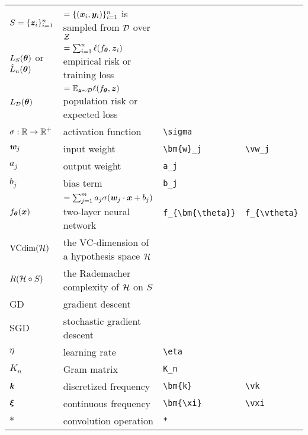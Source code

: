 \documentclass[]{report}
\begin{document}
\begin{center}
\begin{tabular}{l|l|l|l}
        $S=\{\bm{z}_i\}_{i=1}^n$
        & $=\{(\bm{x}_i,\bm{y}_i)\}_{i=1}^n$ is sampled from  $\mathcal{D}$ over  $\mathcal{Z}$\\
        $L_S(\bm{\theta})$ or $\hat{L}_{n}(\bm{\theta})$ & $=\sum_{i=1}^n\ell(f_{\bm{\theta}},\bm{z}_i)$ empirical risk or training loss\\
        $L_{\mathcal{D}}(\bm{\theta})$ &$=\mathbb{E}_{\bm{z}\sim\mathcal{D}}\ell(f_{\bm{\theta}},\bm{z})$ population risk or expected loss\\
        $\sigma:\mathbb{R}\to\mathbb{R}^+$& activation function &\verb!\sigma!\\
        $\bm{w}_j$ &input weight&\verb!\bm{w}_j!&\verb!\vw_j!\\
        $a_j$ &output weight &\verb!a_j!\\
        $b_j$ &bias term &\verb!b_j!\\
        $f_{\bm{\theta}}(\bm{x})$&$=\sum_{j=1}^{m} a_j \sigma (\bm{w}_j\cdot \bm{x} + b_j) $ two-layer neural network &\verb!f_{\bm{\theta}}!&\verb!f_{\vtheta}!\\
         ${\rm VCdim}(\mathcal{H})$& the VC-dimension of a hypothesis space $\mathcal{H}$ \\
        $R (\mathcal{H}\circ S)$& the Rademacher complexity of $\mathcal{H}$ on $S$\\
        GD& gradient descent\\
        SGD &stochastic gradient descent\\
        $\eta$&learning rate&\verb!\eta!\\
        $K_n$&Gram matrix&\verb!K_n!\\
        $\bm{k}$&discretized frequency&\verb!\bm{k}!&\verb!\vk!\\
        $\bm{\xi}$&continuous frequency&\verb!\bm{\xi}!&\verb!\vxi!\\
        $*$&convolution operation &\verb!*!\\
    \end{tabular}
\end{center}
\newpage
\end{document}
